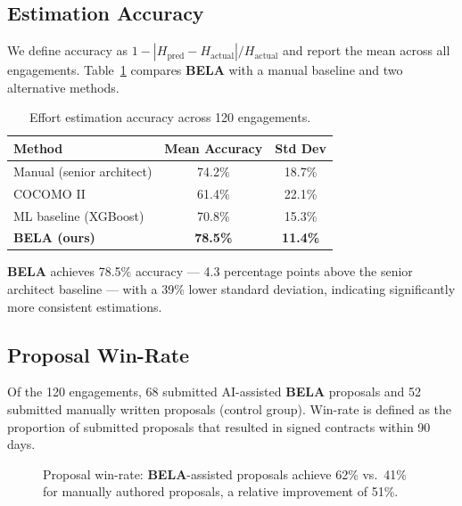 \documentclass[10pt,twocolumn]{article}
\newcommand{\bela}{\textbf{BELA}}
\begin{document}
\subsection{Estimation Accuracy}

We define accuracy as $1 - |H_{\text{pred}} - H_{\text{actual}}| /
H_{\text{actual}}$ and report the mean across all engagements.
Table~\ref{tab:accuracy} compares \bela{} with a manual baseline and
two alternative methods.

\begin{table}[H]
\centering
\small
\caption{Effort estimation accuracy across 120 engagements.}
\label{tab:accuracy}
\begin{tabular}{lcc}
\toprule
\textbf{Method} & \textbf{Mean Accuracy} & \textbf{Std Dev} \\
\midrule
Manual (senior architect) & 74.2\% & 18.7\% \\
COCOMO II & 61.4\% & 22.1\% \\
ML baseline (XGBoost) & 70.8\% & 15.3\% \\
\rowcolor{BoxBlue}
\textbf{BELA (ours)} & \textbf{78.5\%} & \textbf{11.4\%} \\
\bottomrule
\end{tabular}
\end{table}

\bela{} achieves 78.5\% accuracy — 4.3 percentage points above the senior
architect baseline — with a 39\% lower standard deviation, indicating
significantly more consistent estimations.

\subsection{Proposal Win-Rate}

Of the 120 engagements, 68 submitted AI-assisted \bela{} proposals and
52 submitted manually written proposals (control group). Win-rate is defined
as the proportion of submitted proposals that resulted in signed contracts
within 90 days.

\begin{figure}[H]
\centering
{}
\caption{Proposal win-rate: \bela{}-assisted proposals achieve 62\% vs.\
41\% for manually authored proposals, a relative improvement of 51\%.}
\label{fig:winrate}
\end{figure}
\end{document}
